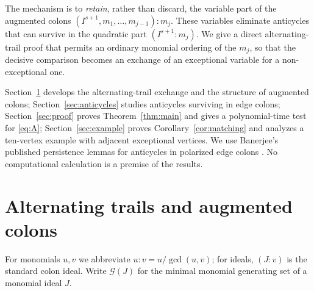 \documentclass[11pt,a4paper]{article}
\theoremstyle{remark}\newtheorem{remark}[theorem]{Remark}
\newcommand{\GG}{\mathcal G}
\begin{document}
The mechanism is to \emph{retain}, rather than discard, the variable part of the augmented colons $(I^{s+1},m_1,\dots,m_{j-1}):m_j$. These variables eliminate anticycles that can survive in the quadratic part $(I^{s+1}:m_j)$. We give a direct alternating-trail proof that permits an ordinary monomial ordering of the $m_j$, so that the decisive comparison becomes an exchange of an exceptional variable for a non-exceptional one.

Section~\ref{sec:colons} develops the alternating-trail exchange and the structure of augmented colons; Section~\ref{sec:anticycles} studies anticycles surviving in edge colons; Section~\ref{sec:proof} proves Theorem~\ref{thm:main} and gives a polynomial-time test for \eqref{eq:A}; Section~\ref{sec:example} proves Corollary~\ref{cor:matching} and analyzes a ten-vertex example with adjacent exceptional vertices. We use Banerjee's published persistence lemmas for anticycles in polarized edge colons \cite[Lemmas 6.14 and 6.15]{Banerjee}. No computational calculation is a premise of the results.

\section{Alternating trails and augmented colons}\label{sec:colons}
For monomials $u,v$ we abbreviate $u:v=u/\gcd(u,v)$; for ideals, $(J:v)$ is the standard colon ideal. Write $\GG(J)$ for the minimal monomial generating set of a monomial ideal $J$.
\end{document}
